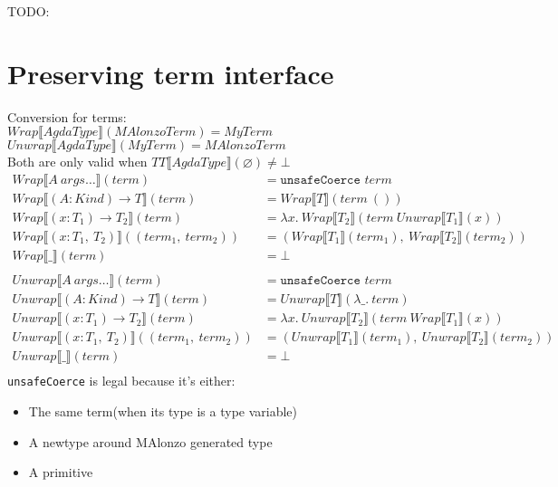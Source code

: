 TODO:

\section{Preserving term interface}

Conversion for terms:\\
\(Wrap\llbracket AgdaType \rrbracket(MAlonzoTerm) = MyTerm \)\\
\(Unwrap\llbracket AgdaType \rrbracket(MyTerm) = MAlonzoTerm \)\\
Both are only valid when \(TT\llbracket AgdaType \rrbracket(\varnothing) \neq \bot\)
\begin{align*}
   Wrap\llbracket A\ args\ldots \rrbracket(term) &= \texttt{unsafeCoerce } term\\
   Wrap\llbracket (A : Kind) \rightarrow T \rrbracket(term) &= Wrap\llbracket T \rrbracket(term\ ())\\
   Wrap\llbracket (x : T_1) \rightarrow T_2 \rrbracket(term) &=
      \lambda x.\ Wrap\llbracket T_2 \rrbracket(term\ Unwrap\llbracket T_1 \rrbracket(x))\\
   Wrap\llbracket (x : T_1,\ T_2) \rrbracket((term_1,\ term_2)) &=
      (Wrap\llbracket T_1 \rrbracket(term_1),\ Wrap\llbracket T_2 \rrbracket(term_2))\\
   Wrap\llbracket \_ \rrbracket(term) &= \bot\\
   \\
   Unwrap\llbracket A\ args\ldots \rrbracket(term) &= \texttt{unsafeCoerce } term\\
   Unwrap\llbracket (A : Kind) \rightarrow T \rrbracket(term) &= Unwrap\llbracket T \rrbracket(\lambda \_.\ term)\\
   Unwrap\llbracket (x : T_1) \rightarrow T_2 \rrbracket(term) &=
      \lambda x.\ Unwrap\llbracket T_2 \rrbracket(term\ Wrap\llbracket T_1 \rrbracket(x))\\
   Unwrap\llbracket (x : T_1,\ T_2) \rrbracket((term_1,\ term_2)) &=
      (Unwrap\llbracket T_1 \rrbracket(term_1),\ Unwrap\llbracket T_2 \rrbracket(term_2))\\
   Unwrap\llbracket \_ \rrbracket(term) &= \bot\\
\end{align*}
\texttt{unsafeCoerce} is legal because it's either:
\begin{itemize}
\item The same term(when its type is a type variable)
\item A newtype around MAlonzo generated type
\item A primitive
\end{itemize}
